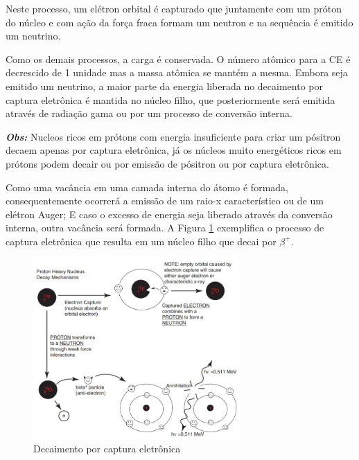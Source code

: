 \documentclass[11pt,a4paper]{article}
\begin{document}
                Neste processo, um elétron orbital é capturado que juntamente com um  próton do núcleo e com ação da força fraca formam um neutron e na sequência é emitido um neutrino.

                Como os demais processos, a carga é conservada. O número atômico para a CE é decrescido de 1 unidade mas a massa atômica se mantém a mesma. Embora seja emitido um neutrino, a maior parte da energia liberada no decaimento por captura eletrônica é mantida no núcleo filho, que posteriormente será emitida através de radiação gama ou por um processo de conversão interna.

                \textbf{\textit{\textcolor{CarnationPink}{Obs:}}} Nucleos ricos em prótons com energia insuficiente para criar um pósitron decaem apenas por captura eletrônica, já os núcleos muito energéticos ricos em prótons podem decair ou por emissão de pósitron ou por captura eletrônica.

                Como uma vacância em uma camada interna do átomo é formada, consequentemente ocorrerá a emissão de um raio-x característico ou de um elétron Auger; E caso o excesso de energia seja liberado através da conversão interna, outra vacância será formada. A Figura \ref{fig:decaimentoPorCapturaEletronica} exemplifica o processo de captura eletrônica que resulta em um núcleo filho que decai por $\beta^+$.

                \begin{figure}[h]
                    \centering
                    \includegraphics[width=0.7\textwidth]{Imagens/decaimentoPorCapturaEletronica.jpg}
                    \caption{Decaimento por captura eletrônica}
                    \label{fig:decaimentoPorCapturaEletronica}
                \end{figure}
\end{document}
